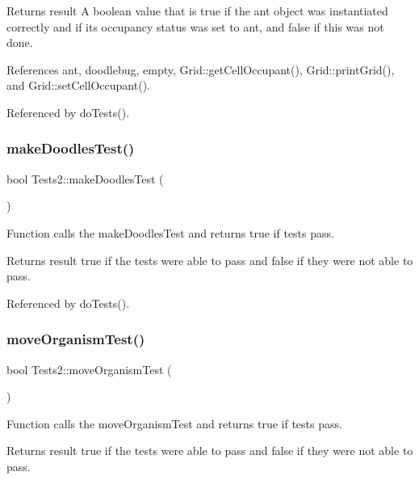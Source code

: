 \begin{DoxyReturn}{Returns}
result A boolean value that is true if the ant object was instantiated correctly and if its occupancy status was set to ant, and false if this was not done. 
\end{DoxyReturn}


References ant, doodlebug, empty, Grid\+::get\+Cell\+Occupant(), Grid\+::print\+Grid(), and Grid\+::set\+Cell\+Occupant().



Referenced by do\+Tests().

\mbox{\label{classTests2_a0c6c7e5d60e7c6dc8799fa14e2b997b4}} 
\subsubsection{make\+Doodles\+Test()}
{\footnotesize\ttfamily bool Tests2\+::make\+Doodles\+Test (\begin{DoxyParamCaption}{ }\end{DoxyParamCaption})}

Function calls the make\+Doodles\+Test and returns true if tests pass.

\begin{DoxyReturn}{Returns}
result true if the tests were able to pass and false if they were not able to pass. 
\end{DoxyReturn}


Referenced by do\+Tests().

\mbox{\label{classTests2_a2ab8e952ccdd1777f6d549ad9409e61b}} 
\subsubsection{move\+Organism\+Test()}
{\footnotesize\ttfamily bool Tests2\+::move\+Organism\+Test (\begin{DoxyParamCaption}{ }\end{DoxyParamCaption})}

Function calls the move\+Organism\+Test and returns true if tests pass.

\begin{DoxyReturn}{Returns}
result true if the tests were able to pass and false if they were not able to pass. 
\end{DoxyReturn}


